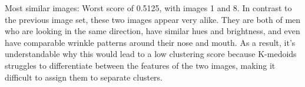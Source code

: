 \documentclass[11pt]{article}
\begin{document}
Most similar images: Worst score of 0.5125, with images 1 and 8. In contrast to the previous image set, these two images appear very alike. They are both of men who are looking in the same direction, have similar hues and brightness, and even have comparable wrinkle patterns around their nose and mouth. As a result, it's understandable why this would lead to a low clustering score because K-medoids struggles to differentiate between the features of the two images, making it difficult to assign them to separate clusters.
\end{document}
